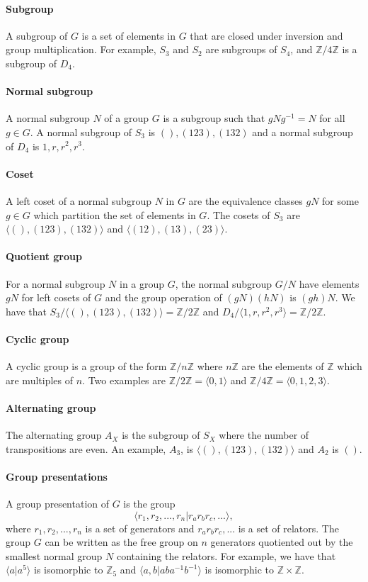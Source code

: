 \documentclass[]{article}
\begin{document}
\paragraph{Subgroup} A subgroup of $G$ is a set of elements in $G$ that are closed under inversion and group multiplication. For example, $S_3$ and $S_2$ are subgroups of $S_4$, and $\mathbb{Z}/4 \mathbb{Z}$ is a subgroup of $D_4$.
\paragraph{Normal subgroup} A normal subgroup $N$ of a group $G$ is a subgroup such that $g N g^{-1} = N$ for all $g \in G$. A normal subgroup of $S_3$ is $(), (123), (132)$ and a normal subgroup of $D_4$ is $1, r, r^2, r^3$. 
\paragraph{Coset} A left coset of a normal subgroup $N$ in $G$ are the equivalence classes $gN$ for some $g \in G$ which partition the set of elements in $G$. The cosets of $S_3$ are $\langle (), (123), (132) \rangle$ and $\langle (12), (13), (23) \rangle$.
\paragraph{Quotient group} For a normal subgroup $N$ in a group $G$, the normal subgroup $G/N$ have elements $gN$ for left cosets of $G$ and the group operation of $(gN)(hN)$ is $(gh)N$. We have that $S_3/\langle (), (123), (132) \rangle = \mathbb{Z}/2 \mathbb{Z}$ and $D_4/ \langle 1, r, r^2, r^3 \rangle = \mathbb{Z}/2 \mathbb{Z}$.
\paragraph{Cyclic group } A cyclic group is a group of the form $\mathbb{Z}/n\mathbb{Z}$ where $n\mathbb{Z}$ are the elements of $\mathbb{Z}$ which are multiples of $n$. Two examples are $\mathbb{Z}/2 \mathbb{Z} = \langle 0, 1 \rangle $ and $\mathbb{Z}/4 \mathbb{Z} = \langle 0, 1, 2, 3 \rangle$. 
\paragraph{Alternating group} The alternating group $A_X$ is the subgroup of $S_X$ where the number of transpositions are even. An example, $A_3$, is $\langle (), (123), (132) \rangle$ and $A_2$ is $()$. 
\paragraph{Group presentations} A group presentation of $G$ is the group 
\begin{equation}
	\langle r_1, r_2, ..., r_n | r_a r_b r_c, ...\rangle,
\end{equation}
where $r_1, r_2, ..., r_n$ is a set of generators and $r_a r_b r_c, ...$ is a set of relators.
The group $G$ can be written as the free group on $n$ generators quotiented out by the smallest normal group $N$ containing the relators. 
For example, we have that $\langle a | a^5 \rangle$ is isomorphic to $\mathbb{Z}_5$ and $ \langle a, b | aba^{-1}b^{-1} \rangle$ is isomorphic to $\mathbb{Z} \times \mathbb{Z}$. 
\end{document}
